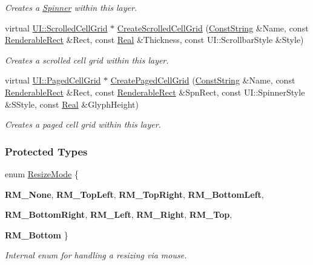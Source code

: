 \begin{DoxyCompactItemize}
\begin{DoxyCompactList}\small\item\em Creates a \hyperlink{classphys_1_1UI_1_1Spinner}{Spinner} within this layer. \item\end{DoxyCompactList}\item 
virtual \hyperlink{classphys_1_1UI_1_1ScrolledCellGrid}{UI::ScrolledCellGrid} $\ast$ \hyperlink{classphys_1_1UI_1_1Window_ade46bf7aae0302d8b2d44a4513eb0915}{CreateScrolledCellGrid} (\hyperlink{namespacephys_a5ce5049f8b4bf88d6413c47b504ebb31}{ConstString} \&Name, const \hyperlink{structphys_1_1UI_1_1RenderableRect}{RenderableRect} \&Rect, const \hyperlink{namespacephys_af7eb897198d265b8e868f45240230d5f}{Real} \&Thickness, const UI::ScrollbarStyle \&Style)
\begin{DoxyCompactList}\small\item\em Creates a scrolled cell grid within this layer. \item\end{DoxyCompactList}\item 
virtual \hyperlink{classphys_1_1UI_1_1PagedCellGrid}{UI::PagedCellGrid} $\ast$ \hyperlink{classphys_1_1UI_1_1Window_a8d38e4d364a3b25731e4fba4032f0acf}{CreatePagedCellGrid} (\hyperlink{namespacephys_a5ce5049f8b4bf88d6413c47b504ebb31}{ConstString} \&Name, const \hyperlink{structphys_1_1UI_1_1RenderableRect}{RenderableRect} \&Rect, const \hyperlink{structphys_1_1UI_1_1RenderableRect}{RenderableRect} \&SpnRect, const UI::SpinnerStyle \&SStyle, const \hyperlink{namespacephys_af7eb897198d265b8e868f45240230d5f}{Real} \&GlyphHeight)
\begin{DoxyCompactList}\small\item\em Creates a paged cell grid within this layer. \item\end{DoxyCompactList}\end{DoxyCompactItemize}
\subsubsection*{Protected Types}
\begin{DoxyCompactItemize}
\item 
enum \hyperlink{classphys_1_1UI_1_1Window_ab7ecb300d312f54556615d3a3b8c6dc9}{ResizeMode} \{ \par
{\bfseries RM\_\-None}, 
{\bfseries RM\_\-TopLeft}, 
{\bfseries RM\_\-TopRight}, 
{\bfseries RM\_\-BottomLeft}, 
\par
{\bfseries RM\_\-BottomRight}, 
{\bfseries RM\_\-Left}, 
{\bfseries RM\_\-Right}, 
{\bfseries RM\_\-Top}, 
\par
{\bfseries RM\_\-Bottom}
 \}
\begin{DoxyCompactList}\small\item\em Internal enum for handling a resizing via mouse. \item\end{DoxyCompactList}\end{DoxyCompactItemize}
